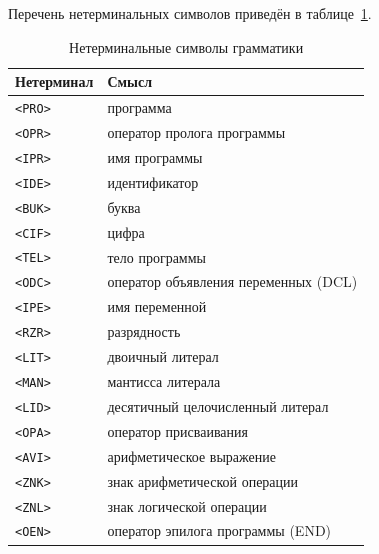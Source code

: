 \documentclass[a4paper,14pt]{extarticle}
\begin{document}
Перечень нетерминальных символов приведён в таблице~\ref{tab:nonterm}.

\begin{table}[H]
\centering
\caption{Нетерминальные символы грамматики}
\label{tab:nonterm}
\begin{tabularx}{\textwidth}{|l|X|}
  \hline
  \textbf{Нетерминал} & \textbf{Смысл} \\
  \hline
  \texttt{<PRO>} & программа \\
  \texttt{<OPR>} & оператор пролога программы \\
  \texttt{<IPR>} & имя программы \\
  \texttt{<IDE>} & идентификатор \\
  \texttt{<BUK>} & буква \\
  \texttt{<CIF>} & цифра \\
  \texttt{<TEL>} & тело программы \\
  \texttt{<ODC>} & оператор объявления переменных (DCL) \\
  \texttt{<IPE>} & имя переменной \\
  \texttt{<RZR>} & разрядность \\
  \texttt{<LIT>} & двоичный литерал \\
  \texttt{<MAN>} & мантисса литерала \\
  \texttt{<LID>} & десятичный целочисленный литерал \\
  \texttt{<OPA>} & оператор присваивания \\
  \texttt{<AVI>} & арифметическое выражение \\
  \texttt{<ZNK>} & знак арифметической операции \\
  \texttt{<ZNL>} & знак логической операции \\
  \texttt{<OEN>} & оператор эпилога программы (END) \\
  \hline
\end{tabularx}
\end{table}
\end{document}
